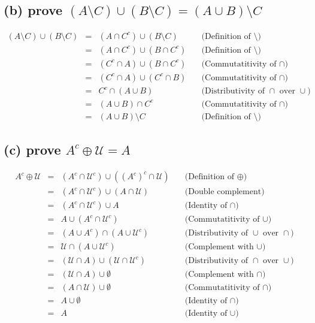\documentclass[]{article}
\begin{document}
\begin{spacing}{1.5}
\subsection*{(b) prove $ (A \setminus C)\cup(B \setminus C)=(A\cup B) \setminus C $ }
\[\begin{array}{rclr}
	(A \setminus  C) \cup  (B \setminus  C)&=& (A \cap  C^{c} ) \cup  (B \setminus  C) &\quad\text{(Definition of $\setminus$)}\\
	&=& (A \cap  C^{c} ) \cup  (B \cap  C^{c} ) &\quad\text{(Definition of $\setminus$)}\\
	&=& (C^{c}  \cap  A) \cup  (B \cap  C^{c} ) &\quad\text{(Commutatitivity of $\cap$)}\\
	&=& (C^{c}  \cap  A) \cup  (C^{c}  \cap  B) &\quad\text{(Commutatitivity of $\cap$)}\\
	&=& C^{c}  \cap  (A \cup  B) &\quad\text{(Distributivity of $\cap$ over $\cup$)}\\
	&=& (A \cup  B) \cap  C^{c}  &\quad\text{(Commutatitivity of $\cap$)}\\
	&=& (A \cup  B) \setminus  C &\quad\text{(Definition of $\setminus$)}
\end{array}\]

\subsection*{(c) prove $ A^{c}\oplus\mathcal{U}=A $}
\[\begin{array}{rclr}
	A^{c} \oplus \mathcal{U} &=& (A^{c}  \cap  \mathcal{U} ^{c} ) \cup  ((A^{c}) ^{c}  \cap  \mathcal{U} ) &\quad\text{(Definition of $\oplus$)}\\
	&=& (A^{c}  \cap  \mathcal{U} ^{c} ) \cup  (A \cap  \mathcal{U} ) &\quad\text{(Double complement)}\\
	&=& (A^{c}  \cap  \mathcal{U} ^{c} ) \cup  A &\quad\text{(Identity of $\cap$)}\\
	&=& A \cup  (A^{c}  \cap  \mathcal{U} ^{c} ) &\quad\text{(Commutatitivity of $\cup$)}\\
	&=& (A \cup  A^{c} ) \cap  (A \cup  \mathcal{U} ^{c} ) &\quad\text{(Distributivity of $\cup$ over $\cap$)}\\
	&=& \mathcal{U}  \cap  (A \cup  \mathcal{U} ^{c} ) &\quad\text{(Complement with $\cup$)}\\
	&=& (\mathcal{U}  \cap  A) \cup  (\mathcal{U}  \cap  \mathcal{U} ^{c} ) &\quad\text{(Distributivity of $\cap$ over $\cup$)}\\
	&=& (\mathcal{U}  \cap  A) \cup  \emptyset  &\quad\text{(Complement with $\cap$)}\\
	&=& (A \cap  \mathcal{U} ) \cup  \emptyset  &\quad\text{(Commutatitivity of $\cap$)}\\
	&=& A \cup  \emptyset  &\quad\text{(Identity of $\cap$)}\\
	&=& A &\quad\text{(Identity of $\cup$)}
\end{array}\]

\end{spacing}
\end{document}
